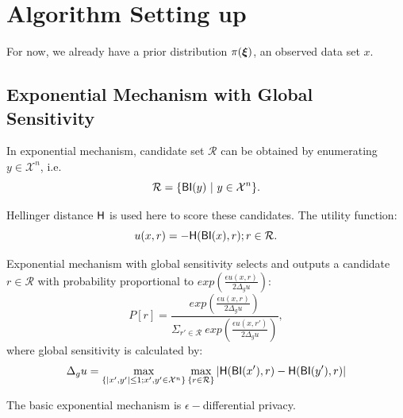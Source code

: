 \documentclass[sigconf, anonymous]{acmart}
\begin{document}
\section{Algorithm Setting up}
\label{sec_setup}
For now, we already have a prior distribution $\pi(\boldsymbol{\xi})$, an observed data set $x$.

\subsection{Exponential Mechanism with Global Sensitivity}
\label{subsec_emgs}


In exponential mechanism, candidate set $\mathcal{R}$ can be obtained by enumerating $y \in \mathcal{X}^n$, i.e.
\begin{equation*}
\mathcal{R} = \{\mathsf{BI}(y)\ |\ y \in \mathcal{X}^n\}.
\end{equation*}

Hellinger distance $\mathsf{H}$ is used here to score these candidates. The utility function:
\begin{equation}
\label{equ_utility}
u(x,r) = -\mathsf{H}(\mathsf{BI}(x), r); r \in \mathcal{R}.
\end{equation}

Exponential mechanism with global sensitivity selects and outputs a candidate $r \in \mathcal{R}$ with probability proportional to $exp(\frac{\epsilon u(x,r)}{2 \Delta_{g}u})$:
\begin{equation*}
P[r] = \frac
{exp(\frac{\epsilon u(x,r)}{2 \Delta_{g}u})}
{\Sigma_{r' \in \mathcal{R}}\ exp(\frac{\epsilon u(x,r')}{2 \Delta_{g}u})},
\end{equation*}
where global sensitivity is calculated by:
\begin{equation*}
\Delta_{g}u = 
\max_{\{|x',y'| \leq 1;x',y'\in \mathcal{X}^n\}}\max_{\{r\in \mathcal{R}\}}
|\mathsf{H}(\mathsf{BI}(x'), r) - \mathsf{H}(\mathsf{BI}(y'), r)|
\end{equation*}

The basic exponential mechanism is $\epsilon -$differential privacy\cite{dwork2014algorithmic}.

\end{document}
